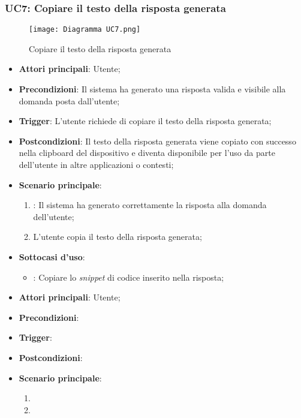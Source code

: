\hypertarget{UC7}{}
\subsubsection{UC7: Copiare il testo della risposta generata}

\begin{figure}[h]
    \centering
    \texttt{[image: Diagramma UC7.png]}
    \caption{Copiare il testo della risposta generata}
\end{figure}

\begin{itemize}
    \item \textbf{Attori principali}: Utente;
    \item \textbf{Precondizioni}: Il sistema ha generato una risposta valida e visibile alla domanda posta dall'utente;
    \item \textbf{Trigger}: L'utente richiede di copiare il testo della risposta generata;
    \item \textbf{Postcondizioni}: Il testo della risposta generata viene copiato con successo nella clipboard del dispositivo e diventa disponibile per l'uso da parte dell'utente in altre applicazioni o contesti;
    \item \textbf{Scenario principale}:
    \begin{enumerate}
        \item {}: Il sistema ha generato correttamente la risposta alla domanda dell'utente;
        \item L'utente copia il testo della risposta generata;
    \end{enumerate}

    \item \textbf{Sottocasi d'uso}:
    \begin{itemize}
        \item {}: Copiare lo \emph{snippet} di codice inserito nella risposta;
    \end{itemize}
\end{itemize}

\hypertarget{UC7.1}{}

\begin{itemize}
    \item \textbf{Attori principali}: Utente;
    \item \textbf{Precondizioni}: 
    \item \textbf{Trigger}: 
    \item \textbf{Postcondizioni}: 
    \item \textbf{Scenario principale}:
    \begin{enumerate}
        \item 
        \item 
    \end{enumerate}
\end{itemize}




